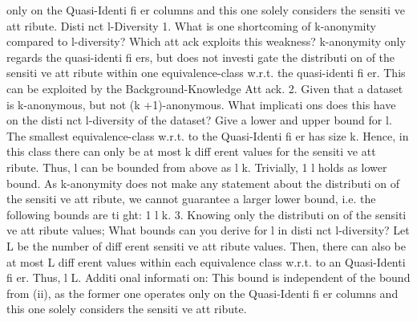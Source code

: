 only on the Quasi-Identi fi er columns and this one solely considers the sensiti ve att ribute.
Disti nct l-Diversity
1. What is one shortcoming of k-anonymity compared to l-diversity? Which att ack exploits this weakness?
k-anonymity only regards the quasi-identi fi ers, but does not investi gate the distributi on of the sensiti ve
att ribute within one equivalence-class w.r.t. the quasi-identi fi er. This can be exploited by the
Background-Knowledge Att ack.
2. Given that a dataset is k-anonymous, but not (k +1)-anonymous. What implicati ons does this have
on the disti nct l-diversity of the dataset? Give a lower and upper bound for l.
The smallest equivalence-class w.r.t. to the Quasi-Identi fi er has size k. Hence, in this class there
can only be at most k diff erent values for the sensiti ve att ribute. Thus, l can be bounded from above
as l k. Trivially, 1 l holds as lower bound. As k-anonymity does not make any statement
about the distributi on of the sensiti ve att ribute, we cannot guarantee a larger lower bound, i.e. the
following bounds are ti ght: 1 l k.
3. Knowing only the distributi on of the sensiti ve att ribute values; What bounds can you derive for l in
disti nct l-diversity?
Let L be the number of diff erent sensiti ve att ribute values. Then, there can also be at most L diff erent
values within each equivalence class w.r.t. to an Quasi-Identi fi er. Thus, l L.
Additi onal informati on: This bound is independent of the bound from (ii), as the former one operates
only on the Quasi-Identi fi er columns and this one solely considers the sensiti ve att ribute.

